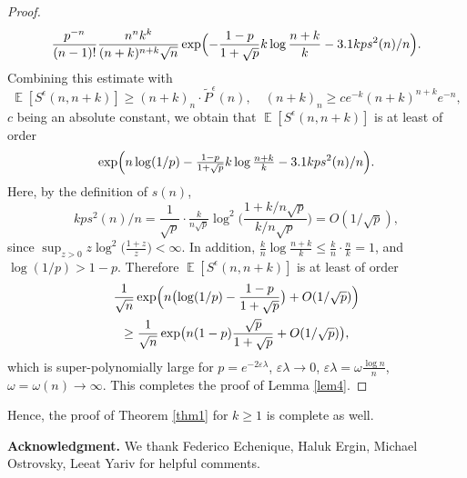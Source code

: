 \documentclass[11pt]{amsart}
\newcommand{\E}{\operatorname{\mathbb{E}}}
\def\eps{\varepsilon}
\theoremstyle{remark}
\numberwithin{equation}{section}
\begin{document}
\begin{proof}
\begin{equation*}
\frac{p^{-n}}{(n-1)!}\frac{n^n k^k}{(n+k)^{n+k}\sqrt{n}}\exp\Bigl(-\frac{1-p}{1+\sqrt{p}}k\log\frac{n+k}{k}-3.1kps^2(n)/n\Bigr).
\end{equation*}
Combining this estimate with 
\begin{equation*}
\E[S^\epsilon (n,n+k)] 
\geq (n+k)_n \cdot \tilde{P}^\epsilon(n),\quad (n+k)_n\ge c e^{-k}(n+k)^{n+k} e^{-n},
\end{equation*}
$c$ being an absolute constant, we obtain that $\E[S^\epsilon (n,n+k)]$ is at least of order
\begin{equation*} 
\exp\Bigl(n\log(1/p)-\tfrac{1-p}{1+\sqrt{p}}k\log\tfrac{n+k}{k}-3.1kps^2(n)/n\Bigr).
\end{equation*}
Here, by the definition of $s(n)$,
\begin{equation*}
kps^2(n)/n=\frac{1}{\sqrt{p}}\cdot\tfrac{k}{n\sqrt{p}}\log^2\bigl(\frac{1+k/n\sqrt{p}}{k/n\sqrt{p}}\bigr)=O(1/\sqrt{p}),
\end{equation*}
since $\sup_{z>0} z\log^2\bigl(\frac{1+z}{z}\bigr)<\infty$.  In addition, $\frac{k}{n}\log\tfrac{n+k}{k}\le \frac{k}{n}\cdot \tfrac{n}{k}=1$, and $\log(1/p)>1-p$. Therefore $\E[S^\epsilon (n,n+k)]$ is at least of order
\begin{multline*}
\frac{1}{\sqrt{n}}\exp\Bigl(n\bigl(\log(1/p)-\frac{1-p}{1+\sqrt{p}}\bigr)+O(1/\sqrt{p})\Bigr)\\
\ge\frac{1}{\sqrt{n}} \exp\bigl(n(1-p)\frac{\sqrt{p}}{1+\sqrt{p}}+O(1/\sqrt{p})\bigr),
\end{multline*}
which is super-polynomially large for $p=e^{-2\eps\lambda}$, $\eps\lambda\to 0$, $\eps\lambda=\omega \tfrac{\log n}{n}$, $\omega=\omega(n)\to\infty$. This completes the proof of Lemma \ref{lem4}.
\end{proof}
Hence, the proof of Theorem \ref{thm1} for $k\ge 1$ is complete as well.

\bigskip\noindent
{\bf Acknowledgment.\/} We thank Federico Echenique, Haluk Ergin, Michael Ostrovsky, Leeat Yariv for helpful comments.
\end{document}
